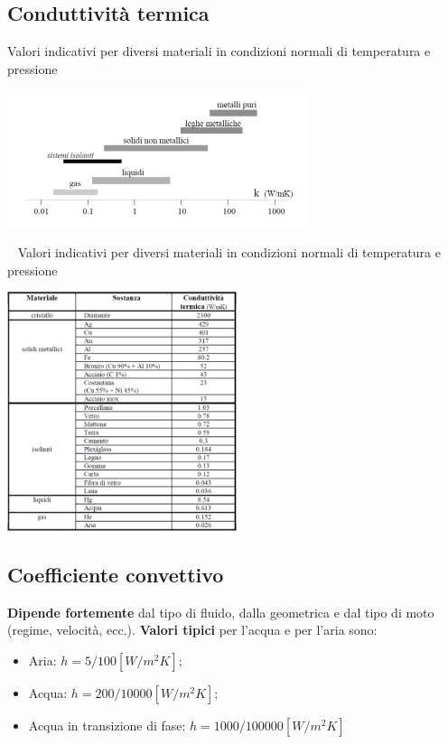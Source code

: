 \subsection{Conduttività termica}
Valori indicativi per diversi materiali in condizioni normali di temperatura e pressione
\begin{center}
    \includegraphics[height=4cm]{../L10/img12.PNG}
\end{center}
\ \newline
Valori indicativi per diversi materiali in condizioni normali di temperatura e pressione
\begin{center}
    \includegraphics[height=7cm]{../L10/img13.PNG}
\end{center}
\subsection{Coefficiente convettivo}
\textbf{Dipende fortemente} dal tipo di fluido, dalla geometrica e dal tipo di moto (regime, velocità, ecc.).\newline
\newline
\textbf{Valori tipici} per l'acqua e per l'aria sono:
\begin{itemize}
    \item Aria: $h = 5/ 100 [W/m^2K]$;
    \item Acqua: $h = 200/10000 [W/m^2K]$;
    \item Acqua in transizione di fase: $h = 1000/100000 [W/m^2K]$
\end{itemize}